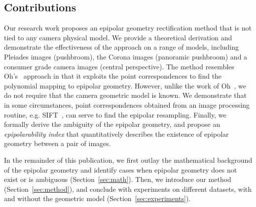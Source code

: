 \documentclass{ipol}
\begin{document}
 


 


\subsection{Contributions}
Our research work proposes an epipolar geometry rectification method that is not tied to any camera physical model. %
We provide a theoretical derivation and demonstrate the effectiveness of the approach on a range of models, including Pleiades images (pushbroom), the Corona images (panoramic pushbroom) and a consumer grade camera images (central perspective).
The method resembles Oh's~\cite{Oh2011} approach in that it exploits the point correspondences to find the polynomial mapping to epipolar geometry. However, unlike the work of Oh~\cite{Oh2011}, we do not require that the camera geometric model is known. We demonstrate that in some circumstances, point correspondences obtained from an image processing routine, e.g. SIFT~\cite{lowe2004distinctive}, can serve to find the epipolar resampling. 
Finally, we formally derive the ambiguity of the epipolar geometry, and propose an \textit{epipolarability index} that quantitatively describes the existence of epipolar geometry between a pair of images.

In the remainder of this publication, we first outlay the mathematical background of the epipolar geometry and identify cases when epipolar geometry does not exist or is ambiguous  (Section~\ref{sec:math}). Then, we introduce our method (Section~\ref{sec:method}), and conclude with experiments on different datasets, with and without the geometric model (Section~\ref{sec:experiments}). 
 
\end{document}
